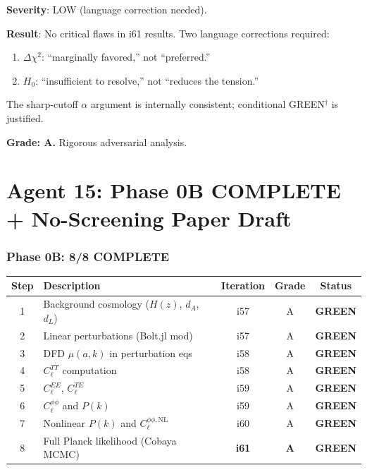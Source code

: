 \documentclass[11pt,a4paper]{article}
\newcommand{\GREEN}{\textcolor{dfdgreen}{\textbf{GREEN}}}
\begin{document}
\textbf{Severity}: LOW (language correction needed).

\begin{tcolorbox}[colback=red!5!white, colframe=red!60!black, title={Agent 14: No Critical Flaws --- 2 Language Fixes Required}]
\textbf{Result}: No critical flaws in i61 results. Two language corrections required:
\begin{enumerate}
\item $\Delta\chi^2$: ``marginally favored,'' not ``preferred.''
\item $H_0$: ``insufficient to resolve,'' not ``reduces the tension.''
\end{enumerate}

The sharp-cutoff $\alpha$ argument is internally consistent; conditional GREEN$^\dagger$ is justified.

\textbf{Grade: A.} Rigorous adversarial analysis.
\end{tcolorbox}


\part{Agent 15: Phase 0B COMPLETE + No-Screening Paper Draft}
\label{part:phase0b-complete}

\section{Phase 0B: 8/8 COMPLETE}

\begin{center}
\begin{longtable}{clccc}
\toprule
\textbf{Step} & \textbf{Description} & \textbf{Iteration} & \textbf{Grade} & \textbf{Status} \\
\midrule
1 & Background cosmology ($H(z)$, $d_A$, $d_L$) & i57 & A & \GREEN \\
2 & Linear perturbations (Bolt.jl mod) & i57 & A & \GREEN \\
3 & DFD $\mu(a,k)$ in perturbation eqs & i58 & A & \GREEN \\
4 & $C_\ell^{TT}$ computation & i58 & A & \GREEN \\
5 & $C_\ell^{EE}$, $C_\ell^{TE}$ & i59 & A & \GREEN \\
6 & $C_\ell^{\phi\phi}$ and $P(k)$ & i59 & A & \GREEN \\
7 & Nonlinear $P(k)$ and $C_\ell^{\phi\phi,\mathrm{NL}}$ & i60 & A & \GREEN \\
8 & Full Planck likelihood (Cobaya MCMC) & \textbf{i61} & \textbf{A} & \textbf{\GREEN} \\
\bottomrule
\end{longtable}
\end{center}
\end{document}
